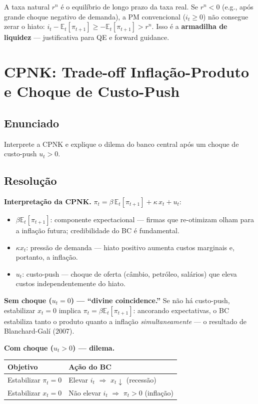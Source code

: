 \documentclass[12pt, a4paper]{article}
\newcommand{\E}{\mathbb{E}}
\begin{document}
\begin{provabox}[title={Armadilha de liquidez --- Para a Prova (Q6)}]
A taxa natural $r^n$ é o equilíbrio de longo prazo da taxa real. Se $r^n < 0$
(e.g., após grande choque negativo de demanda), a PM convencional ($i_t \geq 0$)
não consegue zerar o hiato: $i_t - \E_t[\pi_{t+1}] \geq -\E_t[\pi_{t+1}] > r^n$.
Isso é a \textbf{armadilha de liquidez} --- justificativa para QE e forward guidance.
\end{provabox}

\section{CPNK: Trade-off Inflação-Produto e Choque de Custo-Push}

\subsection*{Enunciado}
Interprete a CPNK e explique o dilema do banco central após um choque de custo-push
$u_t > 0$.

\subsection*{Resolução}

\textbf{Interpretação da CPNK.}
$\pi_t = \beta\,\E_t[\pi_{t+1}] + \kappa\,x_t + u_t$:
\begin{itemize}[leftmargin=1.5em, itemsep=2pt]
  \item $\beta\E_t[\pi_{t+1}]$: componente expectacional --- firmas que re-otimizam
        olham para a inflação futura; credibilidade do BC é fundamental.
  \item $\kappa x_t$: pressão de demanda --- hiato positivo aumenta custos marginais
        e, portanto, a inflação.
  \item $u_t$: custo-push --- choque de oferta (câmbio, petróleo, salários) que
        eleva custos independentemente do hiato.
\end{itemize}

\textbf{Sem choque ($u_t = 0$) --- ``divine coincidence.''}
Se não há custo-push, estabilizar $x_t = 0$ implica $\pi_t = \beta\E_t[\pi_{t+1}]$:
ancorando expectativas, o BC estabiliza tanto o produto quanto a inflação
\emph{simultaneamente} --- o resultado de Blanchard-Galí (2007).

\textbf{Com choque ($u_t > 0$) --- dilema.}
\begin{center}
\begin{tabular}{ll}
\toprule
Objetivo & Ação do BC \\
\midrule
Estabilizar $\pi_t = 0$ & Elevar $i_t$ $\Rightarrow$ $x_t \downarrow$ (recessão) \\
Estabilizar $x_t = 0$ & Não elevar $i_t$ $\Rightarrow$ $\pi_t > 0$ (inflação) \\
\bottomrule
\end{tabular}
\end{center}
\end{document}
